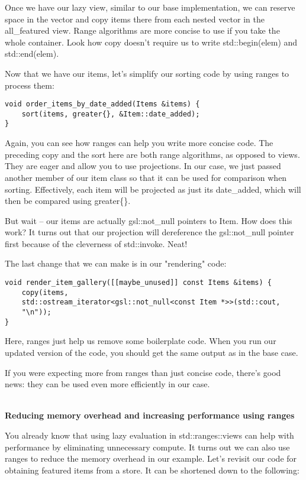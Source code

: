 Once we have our lazy view, similar to our base implementation, we can reserve space in the vector and copy items there from each nested vector in the all\_featured view. Range algorithms are more concise to use if you take the whole container. Look how copy doesn't require us to write std::begin(elem) and std::end(elem).

Now that we have our items, let's simplify our sorting code by using ranges to process them:

\begin{lstlisting}[style=styleCXX]
void order_items_by_date_added(Items &items) {
	sort(items, greater{}, &Item::date_added);
}
\end{lstlisting}

Again, you can see how ranges can help you write more concise code. The preceding copy and the sort here are both range algorithms, as opposed to views. They are eager and allow you to use projections. In our case, we just passed another member of our item class so that it can be used for comparison when sorting. Effectively, each item will be projected as just its date\_added, which will then be compared using greater\{\}.

But wait – our items are actually gsl::not\_null pointers to Item. How does this work? It turns out that our projection will dereference the gsl::not\_null pointer first because of the cleverness of std::invoke. Neat!

The last change that we can make is in our "rendering" code:

\begin{lstlisting}[style=styleCXX]
void render_item_gallery([[maybe_unused]] const Items &items) {
	copy(items,
	std::ostream_iterator<gsl::not_null<const Item *>>(std::cout,
	"\n"));
}
\end{lstlisting}

Here, ranges just help us remove some boilerplate code. When you run our updated version of the code, you should get the same output as in the base case.

If you were expecting more from ranges than just concise code, there's good news: they can be used even more efficiently in our case.

\hspace*{\fill} \\ %
\noindent
\textbf{Reducing memory overhead and increasing performance using ranges}

You already know that using lazy evaluation in std::ranges::views can help with performance by eliminating unnecessary compute. It turns out we can also use ranges to reduce the memory overhead in our example. Let's revisit our code for obtaining featured items from a store. It can be shortened down to the following:

